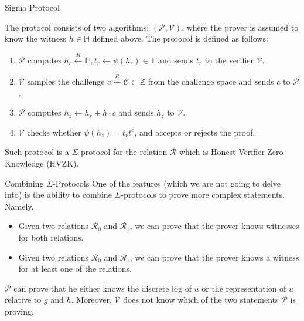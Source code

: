 \documentclass{zkdl-presentation-template}
\begin{document}
    \begin{frame}{Sigma Protocol}
        \begin{definition}
            The protocol consists of two algorithms: $(\mathcal{P}, \mathcal{V})$, where the prover is assumed to know the witness $h \in \mathbb{H}$ defined above. The protocol is defined as follows:
            \begin{enumerate}
                \item $\mathcal{P}$ computes $h_r \xleftarrow{R} \mathbb{H}, t_r \gets \psi(h_r) \in \mathbb{T}$ and sends $t_r$ to the verifier $\mathcal{V}$.
                \item $\mathcal{V}$ samples the challenge $c \xleftarrow{R} \mathcal{C} \subset \mathbb{Z}$ from the challenge space and sends $c$ to $\mathcal{P}$.
                \item $\mathcal{P}$ computes $h_z \gets h_r + h\cdot c$ and sends $h_z$ to $\mathcal{V}$.
                \item $\mathcal{V}$ checks whether $\psi(h_z) = t_r t^c$, and accepts or rejects the proof.
            \end{enumerate}
        \end{definition}

        \begin{theorem}
            Such protocol is a $\Sigma$-protocol for the relation $\mathcal{R}$ which is Honest-Verifier Zero-Knowledge (HVZK).
        \end{theorem}
    \end{frame}

    \begin{frame}{Combining $\Sigma$-Protocols}
        One of the features (which we are not going to delve into) is the ability to combine $\Sigma$-protocols to prove more complex statements. Namely,
        \begin{itemize}
            \item Given two relations $\mathcal{R}_0$ and $\mathcal{R}_1$, we can prove that the prover knows witnesses for both relations.
            \item Given two relations $\mathcal{R}_0$ and $\mathcal{R}_1$, we can prove that the prover knows a witness for at least one of the relations.
        \end{itemize}

        \begin{example}
            $\mathcal{P}$ can prove that he either knows the discrete log of $u$ or the representation of $u$ relative to $g$ and $h$. Moreover, $\mathcal{V}$ does not know which of the two statements $\mathcal{P}$ is proving.
        \end{example}
    \end{frame}
\end{document}
